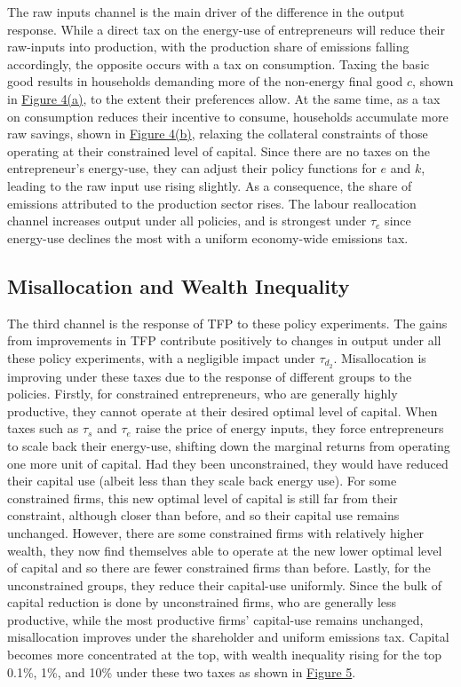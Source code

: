 \documentclass[12pt,a4paper]{article}
\begin{document}
The raw inputs channel is the main driver of the difference in the output response. While a direct tax on the energy-use of entrepreneurs will reduce their raw-inputs into production, with the production share of emissions falling accordingly, the opposite occurs with a tax on consumption. Taxing the basic good results in households demanding more of the non-energy final good $c$, shown in \hyperref[fig:aggregates]{Figure 4(a)}, to the extent their preferences allow. At the same time, as a tax on consumption reduces their incentive to consume, households accumulate more raw savings, shown in \hyperref[fig:aggregates]{Figure 4(b)}, relaxing the collateral constraints of those operating at their constrained level of capital. Since there are no taxes on the entrepreneur's energy-use, they can adjust their policy functions for $e$ and $k$, leading to the raw input use rising slightly. As a consequence, the share of emissions attributed to the production sector rises. The labour reallocation channel increases output under all policies, and is strongest under $\tau_e$  since energy-use declines the most with a uniform economy-wide emissions tax.



\subsection{Misallocation and Wealth Inequality}
\hspace*{6mm} The third channel is the response of TFP to these policy experiments. The gains from improvements in TFP contribute positively to changes in output under all these policy experiments, with a negligible impact under $\tau_{d_2}$. Misallocation is improving under these taxes due to the response of different groups to the policies. Firstly, for constrained entrepreneurs, who are generally highly productive, they cannot operate at their desired optimal level of capital. When taxes such as $\tau_s$ and $\tau_e$ raise the price of energy inputs, they force entrepreneurs to scale back their energy-use, shifting down the marginal returns from operating one more unit of capital. Had they been unconstrained, they would have reduced their capital use (albeit less than they scale back energy use). For some constrained firms, this new optimal level of capital is still far from their constraint, although closer than before, and so their capital use remains unchanged. However, there are some constrained firms with relatively higher wealth, they now find themselves able to operate at the new lower optimal level of capital and so there are fewer constrained firms than before. Lastly, for the unconstrained groups, they reduce their capital-use uniformly. Since the bulk of capital reduction is done by unconstrained firms, who are generally less productive, while the most productive firms' capital-use remains unchanged, misallocation improves under the shareholder and uniform emissions tax. Capital becomes more concentrated at the top, with wealth inequality rising for the top 0.1\%, 1\%, and 10\% under these two taxes as shown in \hyperref[fig:wealth]{Figure 5}. 
\end{document}
